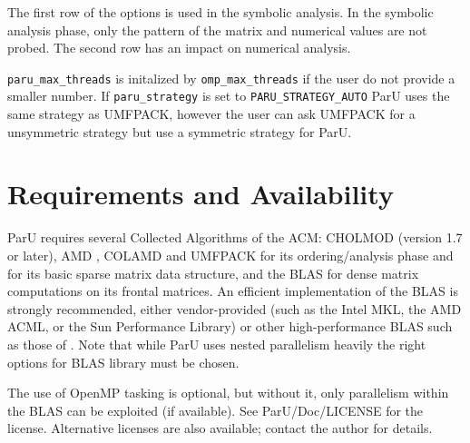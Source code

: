 \documentclass[12pt]{article}
\begin{document}
The first row of the options is used in the symbolic analysis. In the symbolic 
analysis phase, only the pattern of the matrix and numerical values are not 
probed. The second row has an impact on numerical analysis.

\verb'paru_max_threads' is initalized by \verb'omp_max_threads' if the user do 
not provide a smaller number.
If \verb'paru_strategy' is set to \verb'PARU_STRATEGY_AUTO' ParU uses the same 
strategy as UMFPACK, however the user can ask UMFPACK for a unsymmetric strategy 
but use a symmetric strategy for ParU.
    
\section{Requirements and Availability}
\label{summary}

ParU requires several Collected Algorithms of the ACM: CHOLMOD
\cite{ChenDavisHagerRajamanickam09,DavisHager09} (version 1.7 or later), AMD
\cite{AmestoyDavisDuff96,AmestoyDavisDuff03}, COLAMD
\cite{DavisGilbertLarimoreNg00_algo,DavisGilbertLarimoreNg00} and UMFPACK 
\cite{10.1145/992200.992206} for its
ordering/analysis phase and for its basic sparse matrix data structure, and the
BLAS \cite{dddh:90} for dense matrix computations on its frontal matrices. 
An efficient implementation of the BLAS is strongly recommended, either
vendor-provided (such as the Intel MKL, the AMD ACML, or the 
Sun Performance Library) or other high-performance BLAS such as those of 
\cite{GotoVanDeGeijn08}. Note that while ParU uses nested parallelism heavily
the right options for BLAS library must be chosen.

The use of OpenMP tasking is optional, but
without it, only parallelism within the BLAS can be exploited (if available).
See ParU/Doc/LICENSE for the license.
Alternative licenses are also
available; contact the author for details.




\end{document}
